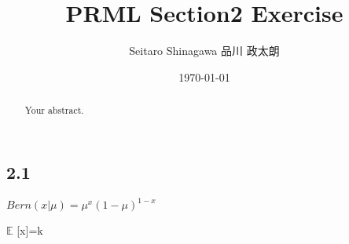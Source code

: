 \documentclass{bxjsarticle}
\title{PRML Section2 Exercise}
\author{Seitaro Shinagawa  品川 政太朗}
\date{\today}
\begin{document}
\maketitle

\begin{abstract}
Your abstract.
\end{abstract}

\subsection{2.1}
$Bern(x|\mu)=\mu^x(1-\mu)^{1-x}$

$\mathbb{E}$ 
[x]=k
\end{document}
